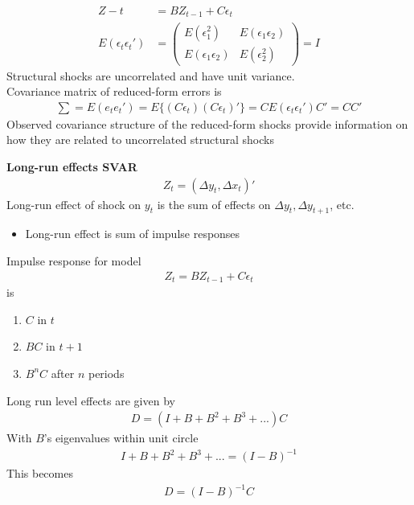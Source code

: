 \documentclass{beamer}
\begin{document}
\begin{frame}
  \begin{align}
    Z-t&= BZ_{t-1}+C\epsilon_t\\
    E(\epsilon_t \epsilon_t') &= \begin{pmatrix} E(\epsilon_1^2) & E(\epsilon_1 \epsilon_2) \\ E(\epsilon_1 \epsilon_2) & E(\epsilon_2^2) \end{pmatrix} = I
  \end{align}
  \medskip
  Structural shocks are uncorrelated and have unit variance.\\
  Covariance matrix of reduced-form errors is 
  \begin{align}
    \sum = E(e_t e_t') = E \{(C\epsilon_t) (C\epsilon_t)'\} = CE(\epsilon_t \epsilon_t')C' = CC'
  \end{align}
  Observed covariance structure of the reduced-form shocks provide information on how they are related to uncorrelated structural shocks
\end{frame}

\begin{frame}
  \textbf{Long-run effects SVAR}
  \begin{align}
    Z_t=(\Delta y_t,\Delta x_t)'
  \end{align}
  \medskip
  Long-run effect of shock on $y_t$ is the sum of effects on $\Delta y_t, \Delta y_{t+1}$, etc.
  \begin{itemize}
     \item Long-run effect is sum of impulse responses
   \end{itemize} 
   Impulse response for model  
  \begin{align}
    Z_t = BZ_{t-1} + C\epsilon_t
  \end{align}
  is 
  \begin{enumerate}
    \item $C$ in $t$
    \item $BC$ in $t+1$
    \item $B^nC$ after $n$ periods
  \end{enumerate}
\end{frame}

\begin{frame}
  Long run level effects are given by
  \begin{align}
    D=(I+B+B^2+B^3+...)C
  \end{align}
  With $B$'s eigenvalues within unit circle 
  \begin{align}
    I+B+B^2+B^3+...=(I-B)^{-1}
  \end{align}
  This becomes
  \begin{align}
  D=(I-B)^{-1}C
  \end{align}
\end{frame}
\end{document}
